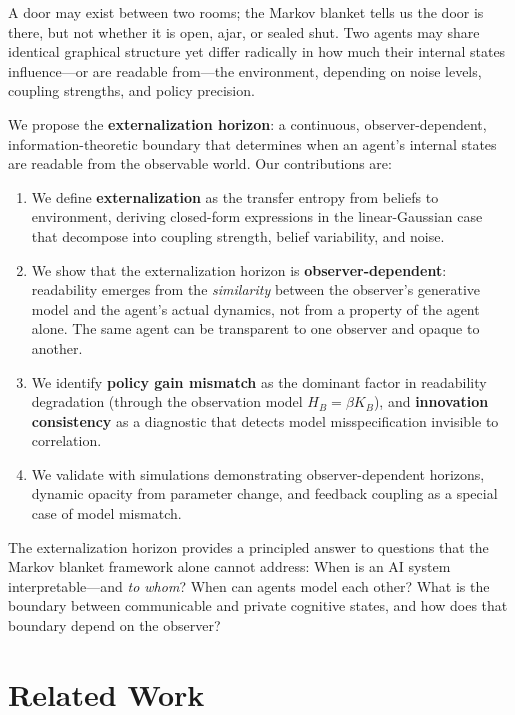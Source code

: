 \documentclass[runningheads]{llncs}
\begin{document}
A door may exist between two rooms; the Markov blanket tells us the door is there, but not whether it is open, ajar, or sealed shut. Two agents may share identical graphical structure yet differ radically in how much their internal states influence---or are readable from---the environment, depending on noise levels, coupling strengths, and policy precision.

We propose the \textbf{externalization horizon}: a continuous, observer-dependent, information-theoretic boundary that determines when an agent's internal states are readable from the observable world. Our contributions are:

\begin{enumerate}
    \item We define \textbf{externalization} as the transfer entropy from beliefs to environment, deriving closed-form expressions in the linear-Gaussian case that decompose into coupling strength, belief variability, and noise.
    \item We show that the externalization horizon is \textbf{observer-dependent}: readability emerges from the \emph{similarity} between the observer's generative model and the agent's actual dynamics, not from a property of the agent alone. The same agent can be transparent to one observer and opaque to another.
    \item We identify \textbf{policy gain mismatch} as the dominant factor in readability degradation (through the observation model $H_B = \beta K_B$), and \textbf{innovation consistency} as a diagnostic that detects model misspecification invisible to correlation.
    \item We validate with simulations demonstrating observer-dependent horizons, dynamic opacity from parameter change, and feedback coupling as a special case of model mismatch.
\end{enumerate}

The externalization horizon provides a principled answer to questions that the Markov blanket framework alone cannot address: When is an AI system interpretable---and \emph{to whom}? When can agents model each other? What is the boundary between communicable and private cognitive states, and how does that boundary depend on the observer?

\section{Related Work}
\label{sec:related}
\end{document}
